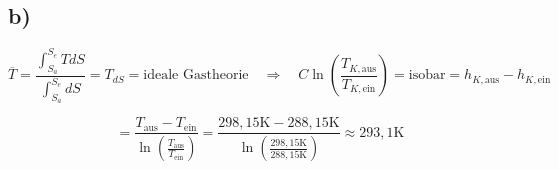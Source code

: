 

\subsection*{b)}

\begin{equation*}
\overline{T} = \frac{\int_{S_a}^{S_e} T dS}{\int_{S_a}^{S_e} dS} = T_{dS} = \text{ideale Gastheorie} \quad \Rightarrow \quad C \ln \left( \frac{T_{K, \text{aus}}}{T_{K, \text{ein}}} \right) = \text{isobar} = h_{K, \text{aus}} - h_{K, \text{ein}}
\end{equation*}

\begin{equation*}
= \frac{T_{\text{aus}} - T_{\text{ein}}}{\ln \left( \frac{T_{\text{aus}}}{T_{\text{ein}}} \right)} = \frac{298,15 \text{K} - 288,15 \text{K}}{\ln \left( \frac{298,15 \text{K}}{288,15 \text{K}} \right)} \approx 293,1 \text{K}
\end{equation*}